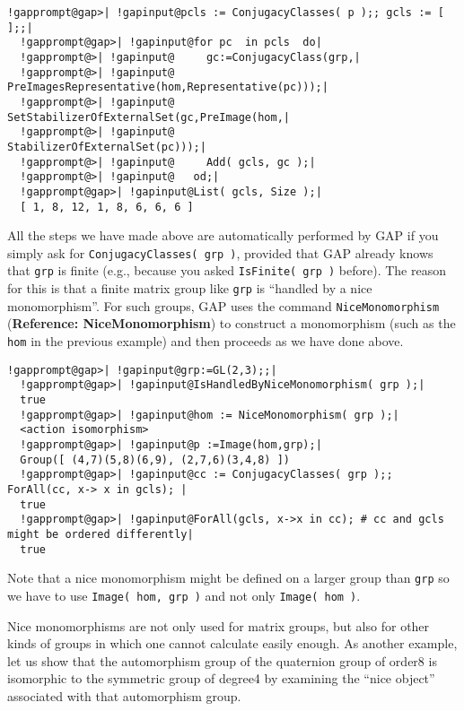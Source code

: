 \documentclass[a4paper,11pt]{report}
\begin{document}
{{ 
\begin{Verbatim}[commandchars=!@|,fontsize=\small,frame=single,label=Example]
  !gapprompt@gap>| !gapinput@pcls := ConjugacyClasses( p );; gcls := [  ];;|
  !gapprompt@gap>| !gapinput@for pc  in pcls  do|
  !gapprompt@>| !gapinput@     gc:=ConjugacyClass(grp,|
  !gapprompt@>| !gapinput@                  PreImagesRepresentative(hom,Representative(pc)));|
  !gapprompt@>| !gapinput@     SetStabilizerOfExternalSet(gc,PreImage(hom,|
  !gapprompt@>| !gapinput@                                     StabilizerOfExternalSet(pc)));|
  !gapprompt@>| !gapinput@     Add( gcls, gc );|
  !gapprompt@>| !gapinput@   od;|
  !gapprompt@gap>| !gapinput@List( gcls, Size );|
  [ 1, 8, 12, 1, 8, 6, 6, 6 ]
\end{Verbatim}
 

 All the steps we have made above are automatically performed by \textsf{GAP} if you simply ask for \texttt{ConjugacyClasses( grp )}, provided that \textsf{GAP} already knows that \texttt{grp} is finite (e.g., because you asked \texttt{IsFinite( grp )} before). The reason for this is that a finite matrix group like \texttt{grp} is ``handled by a nice monomorphism''. For such groups, \textsf{GAP} uses the command \texttt{NiceMonomorphism} (\textbf{Reference: NiceMonomorphism}) to construct a monomorphism (such as the \texttt{hom} in the previous example) and then proceeds as we have done above. 

 
\begin{Verbatim}[commandchars=!@|,fontsize=\small,frame=single,label=Example]
  !gapprompt@gap>| !gapinput@grp:=GL(2,3);;|
  !gapprompt@gap>| !gapinput@IsHandledByNiceMonomorphism( grp );|
  true
  !gapprompt@gap>| !gapinput@hom := NiceMonomorphism( grp );|
  <action isomorphism>
  !gapprompt@gap>| !gapinput@p :=Image(hom,grp);|
  Group([ (4,7)(5,8)(6,9), (2,7,6)(3,4,8) ])
  !gapprompt@gap>| !gapinput@cc := ConjugacyClasses( grp );; ForAll(cc, x-> x in gcls); |
  true
  !gapprompt@gap>| !gapinput@ForAll(gcls, x->x in cc); # cc and gcls might be ordered differently|
  true
\end{Verbatim}
 

 Note that a nice monomorphism might be defined on a larger group than \texttt{grp} {\textendash}so we have to use \texttt{Image( hom, grp )} and not only \texttt{Image( hom )}. 

 Nice monomorphisms are not only used for matrix groups, but also for other
kinds of groups in which one cannot calculate easily enough. As another
example, let us show that the automorphism group of the quaternion group of
order{\nobreakspace}8 is isomorphic to the symmetric group of
degree{\nobreakspace}4 by examining the ``nice object'' associated with that automorphism group. 

}}
\end{document}
